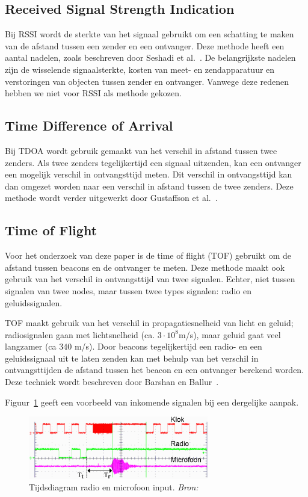 \documentclass[a4paper,10pt]{article}
\begin{document}
\subsection{Received Signal Strength Indication}
Bij RSSI wordt de sterkte van het signaal gebruikt om een schatting te maken van de afstand tussen een zender en een ontvanger. Deze methode heeft een aantal nadelen, zoals beschreven door Seshadi et al.~\cite{seshadri2005bayesian}. De belangrijkste nadelen zijn de wisselende signaalsterkte, kosten van meet- en zendapparatuur en verstoringen van objecten tussen zender en ontvanger. Vanwege deze redenen hebben we niet voor RSSI als methode gekozen.

\subsection{Time Difference of Arrival}
Bij TDOA wordt gebruik gemaakt van het verschil in afstand tussen twee zenders. Als twee zenders tegelijkertijd een signaal uitzenden, kan een ontvanger een mogelijk verschil in ontvangsttijd meten. Dit verschil in ontvangsttijd kan dan omgezet worden naar een verschil in afstand tussen de twee zenders. Deze methode wordt verder uitgewerkt door Gustaffson et al.~\cite{gustafsson2003positioning}.

\subsection{Time of Flight}
Voor het onderzoek van deze paper is de time of flight (TOF) gebruikt om de afstand tussen beacons en de ontvanger te meten. Deze methode maakt ook gebruik van het verschil in ontvangsttijd van twee signalen. Echter, niet tussen signalen van twee nodes, maar tussen twee types signalen: radio en geluidssignalen.

TOF maakt gebruik van het verschil in propagatiesnelheid van licht en geluid; radiosignalen gaan met lichtsnelheid (ca. $3\cdot 10^{8}$m/s), maar geluid gaat veel langzamer (ca $340$ m/s). Door beacons tegelijkertijd een radio- en een geluidssignaal uit te laten zenden kan met behulp van het verschil in ontvangsttijden de afstand tussen het beacon en een ontvanger berekend worden. Deze techniek wordt beschreven door Barshan en Ballur~\cite{barshan2000fast}.

Figuur~\ref{fig:tijdsdiagram} geeft een voorbeeld van inkomende signalen bij een dergelijke aanpak.
\begin{figure}[ht!]
    \centering
    \includegraphics[width=0.7\textwidth]{tijdsdiagram.png}
    \caption{Tijdsdiagram radio en microfoon input. \textit{Bron: \cite{park2011beacon}}}
    \label{fig:tijdsdiagram}
\end{figure}
\end{document}
